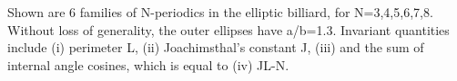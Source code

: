 Shown are 6 families of N-periodics in the elliptic billiard, for N=3,4,5,6,7,8. Without loss of generality, the outer ellipses have a/b=1.3. Invariant quantities include (i) perimeter L, (ii) Joachimsthal's constant J, (iii) and the sum of internal angle cosines, which is equal to (iv) JL-N.